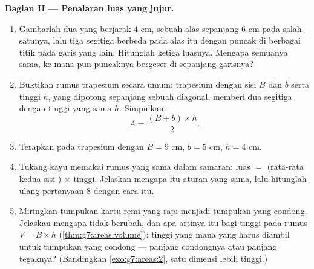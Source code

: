 \begin{problem}[{Soal akhir pekan --- ``bukti'' terkenal bahwa
$64 = 65$, yang dibongkar oleh luas dan kemiringan, dengan piza dan
cincin sebagai pencuci mulut}]
\medskip
\noindent\textbf{Bagian II --- Penalaran luas yang jujur.}
\begin{enumerate}[resume]
  \item Gambarlah dua  yang berjarak $4$ cm, sebuah
        alas sepanjang $6$ cm pada salah satunya, lalu tiga
        segitiga berbeda pada alas itu dengan puncak di berbagai
        titik pada garis yang lain. Hitunglah ketiga luasnya.
        Mengapa semuanya sama, ke mana pun puncaknya bergeser di
        sepanjang garisnya?
  \item Buktikan rumus trapesium secara umum: trapesium dengan
        sisi  $B$ dan $b$ serta tinggi $h$, yang dipotong
        sepanjang sebuah diagonal, memberi dua segitiga dengan
        tinggi yang sama $h$. Simpulkan:
        \[
        A = \frac{(B + b) \times h}{2} .
        \]
  \item Terapkan pada trapesium dengan $B = 9$ cm, $b = 5$ cm,
        $h = 4$ cm.
  \item Tukang kayu memakai rumus yang sama dalam samaran: luas
        $=$ (rata-rata kedua sisi ) $\times$ tinggi.
        Jelaskan mengapa itu aturan yang sama, lalu hitunglah
        ulang pertanyaan 8 dengan cara itu.
  \item Miringkan tumpukan kartu remi yang rapi menjadi tumpukan
        yang condong. Jelaskan mengapa  tidak berubah,
        dan apa artinya itu bagi tinggi pada rumus 
        $V = B \times h$ (\cref{thm:g7:areas:volume}): tinggi yang
        mana yang harus diambil untuk tumpukan yang condong ---
        panjang condongnya atau panjang tegaknya? (Bandingkan
        \cref{exo:g7:areas:2}, satu dimensi lebih tinggi.)
\end{enumerate}


\end{problem}
